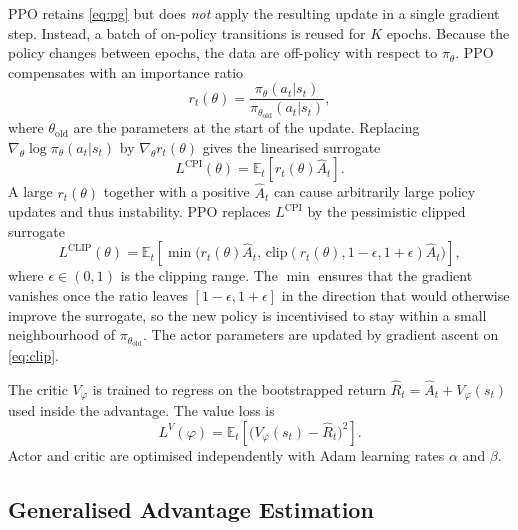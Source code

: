 \documentclass{article}
\theoremstyle{plain}
\theoremstyle{definition}
\theoremstyle{remark}
\begin{document}
PPO retains \cref{eq:pg} but does \emph{not} apply the resulting update in a single gradient step. Instead, a batch of on-policy transitions is reused for $K$ epochs. Because the policy changes between epochs, the data are off-policy with respect to $\pi_\theta$. PPO compensates with an importance ratio
\begin{equation}
    r_t(\theta) = \frac{\pi_\theta(a_t|s_t)}{\pi_{\theta_{\mathrm{old}}}(a_t|s_t)},
    \label{eq:ratio}
\end{equation}
where $\theta_{\mathrm{old}}$ are the parameters at the start of the update. Replacing $\nabla_\theta\log\pi_\theta(a_t|s_t)$ by $\nabla_\theta r_t(\theta)$ gives the linearised surrogate
\begin{equation}
    L^{\mathrm{CPI}}(\theta) = \mathbb{E}_t\!\left[r_t(\theta)\hat A_t\right].
    \label{eq:cpi}
\end{equation}
A large $r_t(\theta)$ together with a positive $\hat A_t$ can cause arbitrarily large policy updates and thus instability. PPO replaces $L^{\mathrm{CPI}}$ by the pessimistic clipped surrogate
\begin{equation}
    \!L^{\mathrm{CLIP}}\!(\theta)\! =\! \mathbb{E}_t\!\left[\min\!\big(r_t(\theta)\hat A_t,\,\mathrm{clip}(r_t(\theta),1\!-\!\epsilon,1\!+\!\epsilon)\hat A_t\big)\right]\!\!,
    \label{eq:clip}
\end{equation}
where $\epsilon\in(0,1)$ is the clipping range. The $\min$ ensures that the gradient vanishes once the ratio leaves $[1-\epsilon,1+\epsilon]$ in the direction that would otherwise improve the surrogate, so the new policy is incentivised to stay within a small neighbourhood of $\pi_{\theta_{\mathrm{old}}}$. The actor parameters are updated by gradient ascent on \cref{eq:clip}.

The critic $V_\varphi$ is trained to regress on the bootstrapped return $\hat R_t = \hat A_t + V_\varphi(s_t)$ used inside the advantage. The value loss is
\begin{equation}
    L^{V}(\varphi) = \mathbb{E}_t\!\left[\big(V_\varphi(s_t) - \hat R_t\big)^{2}\right].
    \label{eq:vloss}
\end{equation}
Actor and critic are optimised independently with Adam learning rates $\alpha$ and $\beta$.

\subsection{Generalised Advantage Estimation}\label{sec:theory:gae}
\end{document}
